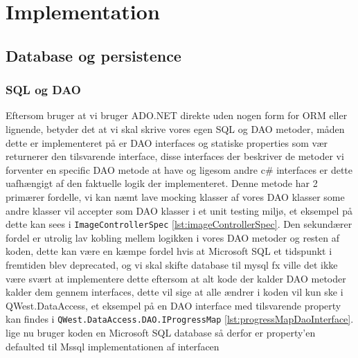 \chapter{Implementation}\label{ch:implementation}

\section{Database og persistence}\label{sec:database}

\subsection{SQL og DAO}\label{sec:sqlOgDao}
Eftersom bruger at vi bruger ADO.NET direkte uden nogen form for ORM eller lignende, betyder det at vi skal skrive vores egen SQL og DAO metoder, måden dette er implementeret på er DAO interfaces og statiske properties som vær returnerer den tilsvarende interface, disse interfaces der beskriver de metoder vi forventer en specific DAO metode at have og ligesom andre c\# interfaces er dette uafhængigt af den faktuelle logik der implementeret.
Denne metode har 2 primærer fordelle, vi kan næmt lave mocking klasser af vores DAO klasser some andre klasser vil accepter som DAO klasser i et unit testing miljø, et eksempel på dette kan sees i \texttt{ImageControllerSpec} \ref{lst:imageControllerSpec}.
Den sekundærer fordel er utrolig lav kobling mellem logikken i vores DAO metoder og resten af koden, dette kan være en kæmpe fordel hvis at Microsoft SQL et tidspunkt i fremtiden blev deprecated, og vi skal skifte database til mysql fx ville det ikke være svært at implementere dette eftersom at alt kode der kalder DAO metoder kalder dem gennem interfaces, dette vil sige at alle ændrer i koden vil kun ske i QWest.DataAccess, et eksempel på en DAO interface med tilsvarende property kan findes i \texttt{QWest.DataAccess.DAO.IProgressMap} \ref{lst:progressMapDaoInterface}.
lige nu bruger koden en Microsoft SQL database så derfor er property'en defaulted til Mssql implementationen af interfacen

